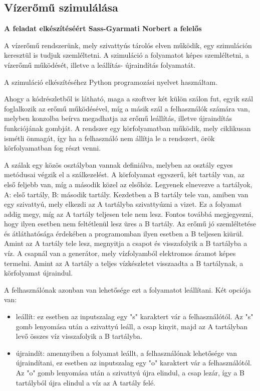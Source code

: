 \documentclass[
]{thesis-ekf}
\theoremstyle{definition}
\theoremstyle{remark}
\begin{document}
		\subsection{Vízerőmű szimulálása}
			\par \textbf{A feladat elkészítéséért Sass-Gyarmati Norbert a felelős}
			\par A vízerőmű rendszerünk, mely szivattyús tárolós elven működik, egy szimuláción keresztül is tudjuk szemléltetni. A szimuláció a folyamatot képes szemléltetni, a vízerőmű működését, illetve a leállítás- újraindítás folyamatát. 
			\par A szimuláció elkészítéséhez Python programozási nyelvet használtam. 
					
								
			\par Ahogy a kódrészletből is látható, maga a szoftver két külön szálon fut, egyik szál foglalkozik az erőmű működésével, míg a másik szál a felhasználók számára van, melyben konzolba beírva megadhatja az erőmű leállítás, illetve újraindítás funkciójának gombját. A rendszer egy körfolyamatban működik, mely ciklikusan ismétli önmagát, így ha a felhasználó nem állítja le a rendszert, örök körfolyamatban fog részt venni. 
			\par A szálak egy közös osztályban vannak definiálva, melyben az osztály egyes metódusai végzik el a szálkezelést. A körfolyamat egyszerű, két tartály van, az első feljebb van, míg a második közel az elsőhöz. Legyenek elnevezve a tartályok, A: első tartály, B: második tartály. Kezdetben a B tartály tele van, amiben van egy szivattyú, mely elkezdi az A tartályba szivattyúzni a vizet. Ez a folyamat addig megy, míg az A tartály teljesen tele nem lesz. Fontos továbbá megjegyezni, hogy ilyen esetben nem feltétlenül lesz üres a B tartály. Az erőmű jó szemléltetése és átláthatósága érdekében a programomban ilyen esetben a B teljesen kiürül. Amint az A tartály tele lesz, megnyitja a csapot és visszafolyik a B tartályba a víz. A csapnál van a generátor, mely vízfolyamból elektromos áramot képes termelni. Amint az A tartály a teljes vízkészletet visszaadta a B tartálynak, a körfolyamat újraindul. 
			\par A felhasználónak azonban van lehetősége ezt a folyamatot leállítani. Két opciója van:
			\begin{itemize}
				\item leállít: ez esetben az inputszalag egy "s" karaktert vár a felhasználótól. Az "s" gomb lenyomása után a szivattyú leáll, a csap kinyit, majd az A tartályban levő összes víz visszafolyik a B tartályba.
				\item újraindít: amennyiben a folyamat leállt, a felhasználónak lehetősége van újraindítani, ez esetben az inputszalag egy "o" karaktert vár a felhasználótól. Az "o" gomb lenyomása után a szivattyú újra elindul, a csap lezár, így a B tartályból újra elindul a víz az A tartály felé.
			\end{itemize}
			
\end{document}
